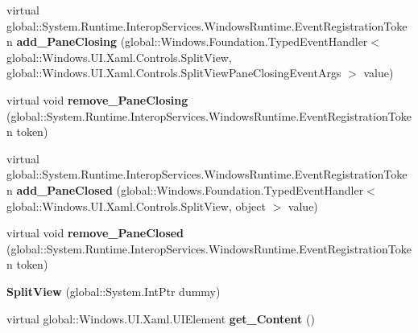 \begin{DoxyCompactItemize}
\item 
\mbox{\label{class_windows_1_1_u_i_1_1_xaml_1_1_controls_1_1_split_view_a1f06fc0c80e7b9e8814204845dac854c}} 
virtual global\+::\+System.\+Runtime.\+Interop\+Services.\+Windows\+Runtime.\+Event\+Registration\+Token {\bfseries add\+\_\+\+Pane\+Closing} (global\+::\+Windows.\+Foundation.\+Typed\+Event\+Handler$<$ global\+::\+Windows.\+U\+I.\+Xaml.\+Controls.\+Split\+View, global\+::\+Windows.\+U\+I.\+Xaml.\+Controls.\+Split\+View\+Pane\+Closing\+Event\+Args $>$ value)
\item 
\mbox{\label{class_windows_1_1_u_i_1_1_xaml_1_1_controls_1_1_split_view_a7e6d1bbf867167e713891bded6a87a82}} 
virtual void {\bfseries remove\+\_\+\+Pane\+Closing} (global\+::\+System.\+Runtime.\+Interop\+Services.\+Windows\+Runtime.\+Event\+Registration\+Token token)
\item 
\mbox{\label{class_windows_1_1_u_i_1_1_xaml_1_1_controls_1_1_split_view_a97df60d3e67c146b713f4eb1565c5602}} 
virtual global\+::\+System.\+Runtime.\+Interop\+Services.\+Windows\+Runtime.\+Event\+Registration\+Token {\bfseries add\+\_\+\+Pane\+Closed} (global\+::\+Windows.\+Foundation.\+Typed\+Event\+Handler$<$ global\+::\+Windows.\+U\+I.\+Xaml.\+Controls.\+Split\+View, object $>$ value)
\item 
\mbox{\label{class_windows_1_1_u_i_1_1_xaml_1_1_controls_1_1_split_view_a512973422bb0ef5a03c4a96d88f7f082}} 
virtual void {\bfseries remove\+\_\+\+Pane\+Closed} (global\+::\+System.\+Runtime.\+Interop\+Services.\+Windows\+Runtime.\+Event\+Registration\+Token token)
\item 
\mbox{\label{class_windows_1_1_u_i_1_1_xaml_1_1_controls_1_1_split_view_a83623aee98314bfa486d2e3c5b583543}} 
{\bfseries Split\+View} (global\+::\+System.\+Int\+Ptr dummy)
\item 
\mbox{\label{class_windows_1_1_u_i_1_1_xaml_1_1_controls_1_1_split_view_a8e8c81d98be4733b9d0e0c12f077d2ab}} 
virtual global\+::\+Windows.\+U\+I.\+Xaml.\+U\+I\+Element {\bfseries get\+\_\+\+Content} ()

\end{DoxyCompactItemize}
